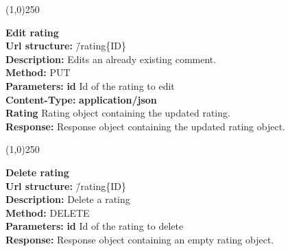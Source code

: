 \documentclass[11pt]{article}
\begin{document}
\begin{center}\line(1,0){250}\end{center}

\begin{tabbing}
\textbf{Edit rating} \\
\textcolor{black!60}{\textbf{Url structure:}} \hspace{0.2in} \= /rating\{ID\} \\
\textcolor{black!60}{\textbf{Description:}}  \> Edits an already existing comment. \\
\textcolor{black!60}{\textbf{Method:}} \> PUT \\
\textcolor{black!60}{\textbf{Parameters:}} \> \textbf{id} Id of the rating to edit \\
\textcolor{black!60}{\textbf{Content-Type:}} \> \textbf{application/json} \\
\> \textbf{Rating} Rating object containing the updated rating. \\
\textcolor{black!60}{\textbf{Response:}} \> Response object containing the updated rating object.
\end{tabbing}

\begin{center}\line(1,0){250}\end{center}

\begin{tabbing}
\textbf{Delete rating} \\
\textcolor{black!60}{\textbf{Url structure:}} \hspace{0.2in} \= /rating\{ID\} \\
\textcolor{black!60}{\textbf{Description:}}  \> Delete a rating \\
\textcolor{black!60}{\textbf{Method:}} \> DELETE \\
\textcolor{black!60}{\textbf{Parameters:}} \> \textbf{id} Id of the rating to delete \\
\textcolor{black!60}{\textbf{Response:}} \> Response object containing an empty rating object.
\end{tabbing}
\end{document}
